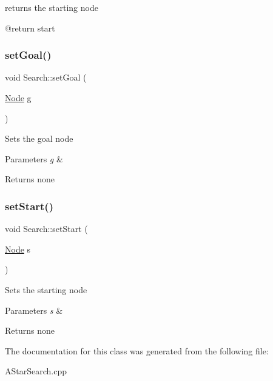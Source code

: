 returns the starting node \begin{DoxyVerb}@return start\end{DoxyVerb}
 \mbox{\label{classSearch_adac3002d9754841372e39e249bc25981}} 
\subsubsection{\texorpdfstring{set\+Goal()}{setGoal()}}
{\footnotesize\ttfamily void Search\+::set\+Goal (\begin{DoxyParamCaption}\item[{\hyperlink{structNode}{Node}}]{g }\end{DoxyParamCaption})\hspace{0.3cm}{\ttfamily [inline]}}

Sets the goal node


\begin{DoxyParams}{Parameters}
{\em g} & \\
\hline
\end{DoxyParams}
\begin{DoxyReturn}{Returns}
none 
\end{DoxyReturn}
\mbox{\label{classSearch_aac5b5b806c6283f2cc827ec14dac0ae3}} 
\subsubsection{\texorpdfstring{set\+Start()}{setStart()}}
{\footnotesize\ttfamily void Search\+::set\+Start (\begin{DoxyParamCaption}\item[{\hyperlink{structNode}{Node}}]{s }\end{DoxyParamCaption})\hspace{0.3cm}{\ttfamily [inline]}}

Sets the starting node


\begin{DoxyParams}{Parameters}
{\em s} & \\
\hline
\end{DoxyParams}
\begin{DoxyReturn}{Returns}
none 
\end{DoxyReturn}


The documentation for this class was generated from the following file\+:\begin{DoxyCompactItemize}
\item 
A\+Star\+Search.\+cpp\end{DoxyCompactItemize}
